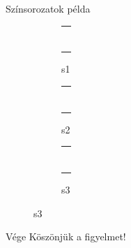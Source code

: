 \documentclass[aspectratio=1610, dvipsnames, xcolor=table]{beamer}
\begin{document}
    \begin{frame}{Színsorozatok példa}
        
        \begin{figure}
            \begin{center}
                \begin{subfigure}[c]{0.3\textwidth}
                
                    \begin{tabular}{p{2cm}}
                        \\ \\ \\ \\ \\ \\ \\ \\            
                    \end{tabular}        
                    \caption*{s1}
                \end{subfigure}
                \begin{subfigure}[c]{0.30\textwidth}
                    
                    \begin{tabular}{p{2cm}}
                        \\ \\ \\ \\ \\ \\ \\ \\            
                    \end{tabular}        
                    \caption*{s2}
                \end{subfigure}
                \begin{subfigure}[c]{0.3\textwidth}
                    
                    \begin{tabular}{p{2cm}}
                        \\ \\ \\ \\ \\ \\ \\ \\            
                    \end{tabular}    
                    \caption*{s3}
                \end{subfigure}
            \end{center}
            
            
        \end{figure}
        
    \end{frame}

    \begin{frame}{Vége}
        \centering \Huge Köszönjük a figyelmet!
    \end{frame}
\end{document}
